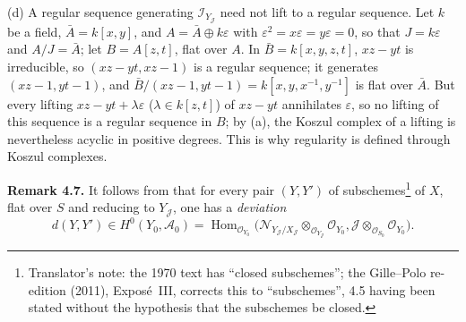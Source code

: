 (d) A regular sequence generating \(\mathscr I_{Y_{\mathscr J}}\) need not lift to a
regular sequence. Let \(k\) be a field, \(\bar A=k[x,y]\), and
\(A=\bar A\oplus k\varepsilon\) with \(\varepsilon^2=x\varepsilon=y\varepsilon=0\),
so that \(J=k\varepsilon\) and \(A/J=\bar A\); let \(B=A[z,t]\), flat over \(A\).
In \(\bar B=k[x,y,z,t]\), \(xz-yt\) is irreducible, so \((xz-yt,xz-1)\) is a
regular sequence; it generates \((xz-1,yt-1)\), and
\(\bar B/(xz-1,yt-1)=k[x,y,x^{-1},y^{-1}]\) is flat over \(\bar A\). But every
lifting \(xz-yt+\lambda\varepsilon\) (\(\lambda\in k[z,t]\)) of \(xz-yt\)
annihilates \(\varepsilon\), so no lifting of this sequence is a regular sequence
in \(B\); by (a), the Koszul complex of a lifting is nevertheless acyclic in
positive degrees. This is why regularity is defined through Koszul complexes.

\medskip
\noindent{}\textbf{Remark 4.7.}
It follows from  that for every pair \((Y,Y')\) of
subschemes\footnote{Translator's note: the 1970 text has ``closed
subschemes''; the Gille--Polo re-edition (2011), Exposé~III, corrects this to
``subschemes'', 4.5 having been stated without the hypothesis that the
subschemes be closed.} of \(X\), flat over \(S\) and reducing to
\(Y_{\mathscr J}\), one has a \emph{deviation}
\[
 d(Y,Y')\in H^0(Y_0,\mathscr A_0)
 =\operatorname{Hom}_{\mathscr O_{Y_0}}
 \bigl(\mathscr N_{Y_{\mathscr J}/X_{\mathscr J}}
  \otimes_{\mathscr O_{Y_{\mathscr J}}}\mathscr O_{Y_0},
  \mathscr J\otimes_{\mathscr O_{S_0}}\mathscr O_{Y_0}\bigr).
\]

